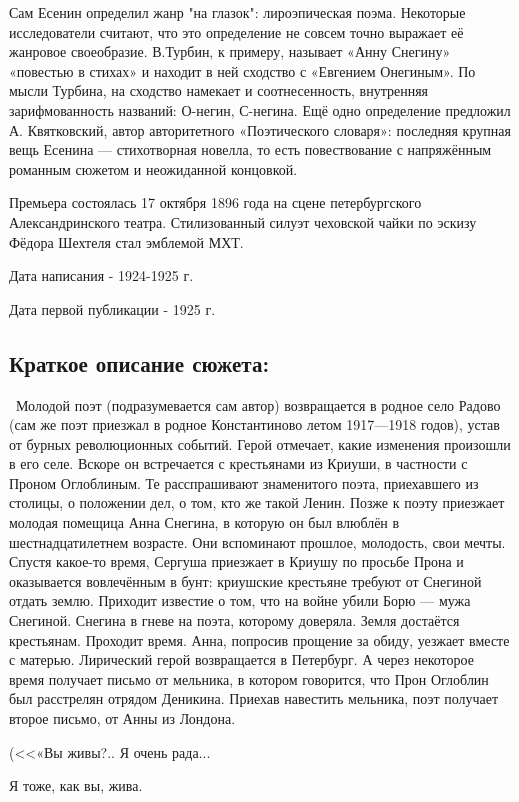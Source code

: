 \documentclass[a4paper,12pt]{article}
\begin{document}
	\noindent
	Сам Есенин определил жанр "на глазок": лироэпическая поэма. Некоторые исследователи считают, что это определение не совсем точно выражает её жанровое своеобразие. В.Турбин, к примеру, называет «Анну Снегину» «повестью в стихах» и находит в ней сходство с «Евгением Онегиным». По мысли Турбина, на сходство намекает и соотнесенность, внутренняя зарифмованность названий: О-негин, С-негина. Ещё одно определение предложил А. Квятковский, автор авторитетного «Поэтического словаря»: последняя крупная вещь Есенина — стихотворная новелла, то есть повествование с напряжённым романным сюжетом и неожиданной концовкой. 
	
	\noindent
	Премьера состоялась 17 октября 1896 года на сцене петербургского Александринского театра. Стилизованный силуэт чеховской чайки по эскизу Фёдора Шехтеля стал эмблемой МХТ.
	
	\noindent
	Дата написания - 1924-1925 г.
	
	\noindent
	Дата первой публикации - 1925 г.
	
	\subsection{Краткое описание сюжета: }
	\quad \, Молодой поэт (подразумевается сам автор) возвращается в родное село Радово (сам же поэт приезжал в родное Константиново летом 1917—1918 годов), устав от бурных революционных событий. Герой отмечает, какие изменения произошли в его селе. Вскоре он встречается с крестьянами из Криуши, в частности с Проном Оглоблиным. Те расспрашивают знаменитого поэта, приехавшего из столицы, о положении дел, о том, кто же такой Ленин. Позже к поэту приезжает молодая помещица Анна Снегина, в которую он был влюблён в шестнадцатилетнем возрасте. Они вспоминают прошлое, молодость, свои мечты. Спустя какое-то время, Сергуша приезжает в Криушу по просьбе Прона и оказывается вовлечённым в бунт: криушские крестьяне требуют от Снегиной отдать землю. Приходит известие о том, что на войне убили Борю — мужа Снегиной. Снегина в гневе на поэта, которому доверяла. Земля достаётся крестьянам. Проходит время. Анна, попросив прощение за обиду, уезжает вместе с матерью. Лирический герой возвращается в Петербург. А через некоторое время получает письмо от мельника, в котором говорится, что Прон Оглоблин был расстрелян отрядом Деникина. Приехав навестить мельника, поэт получает второе письмо, от Анны из Лондона.
	
	\noindent
	(<<«Вы живы?.. Я очень рада...
	
	\noindent
	Я тоже, как вы, жива.
	
\end{document}
